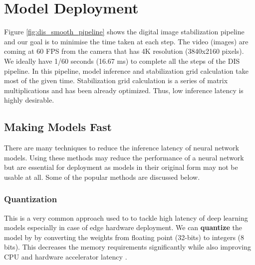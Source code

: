 







\section{Model Deployment}
Figure \ref{fig:dis_smooth_pipeline} shows the digital image stabilization pipeline and our goal is to minimise the time taken at each step. The video (images) are coming at 60 FPS from the camera that has 4K resolution (3840x2160 pixels). We ideally have 1/60 seconds (16.67 ms) to complete all the steps of the DIS pipeline. In this pipeline, model inference and stabilization grid calculation take most of the given time. Stabilization grid calculation is a series of matrix multiplications and has been already optimized. Thus, low inference latency is highly desirable.

\subsection{Making Models Fast}
There are many techniques to reduce the inference latency of neural network models. Using these methods may reduce the performance of a neural network but are essential for deployment as models in their original form may not be usable at all. Some of the popular methods are discussed below.

\subsubsection{Quantization}
This is a very common approach used to to tackle high latency of deep learning models especially in case of edge hardware deployment. We can \textbf{quantize} the model by by converting the weights from floating point (32-bits) to integers (8 bits). This decreases the memory requirements significantly while also improving CPU and hardware accelerator latency \citep{FastModels}. 

